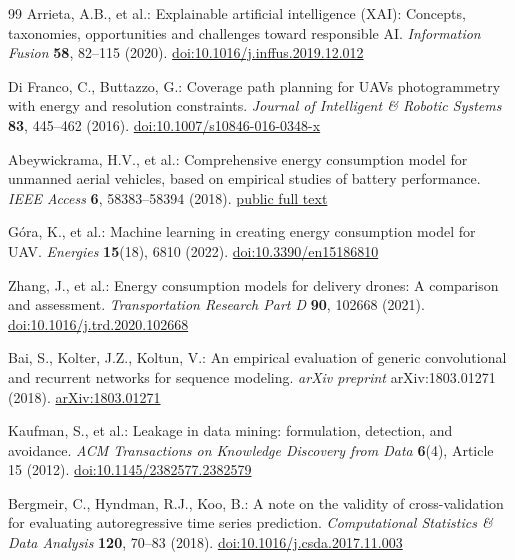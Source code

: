 \documentclass[runningheads,a4paper]{llncs}
\begin{document}
\begin{thebibliography}{99}
Arrieta, A.B., et al.: Explainable artificial intelligence (XAI): Concepts, taxonomies, opportunities and challenges toward responsible AI. \textit{Information Fusion} \textbf{58}, 82--115 (2020). \href{https://doi.org/10.1016/j.inffus.2019.12.012}{doi:10.1016/j.inffus.2019.12.012}

Di Franco, C., Buttazzo, G.: Coverage path planning for UAVs photogrammetry with energy and resolution constraints. \textit{Journal of Intelligent \& Robotic Systems} \textbf{83}, 445--462 (2016). \href{https://doi.org/10.1007/s10846-016-0348-x}{doi:10.1007/s10846-016-0348-x}

Abeywickrama, H.V., et al.: Comprehensive energy consumption model for unmanned aerial vehicles, based on empirical studies of battery performance. \textit{IEEE Access} \textbf{6}, 58383--58394 (2018). \href{https://www.researchgate.net/publication/328188643_Comprehensive_Energy_Consumption_Model_for_Unmanned_Aerial_Vehicles_Based_on_Empirical_Studies_of_Battery_Performance}{public full text}

G\'ora, K., et al.: Machine learning in creating energy consumption model for UAV. \textit{Energies} \textbf{15}(18), 6810 (2022). \href{https://doi.org/10.3390/en15186810}{doi:10.3390/en15186810}

Zhang, J., et al.: Energy consumption models for delivery drones: A comparison and assessment. \textit{Transportation Research Part D} \textbf{90}, 102668 (2021). \href{https://doi.org/10.1016/j.trd.2020.102668}{doi:10.1016/j.trd.2020.102668}

Bai, S., Kolter, J.Z., Koltun, V.: An empirical evaluation of generic convolutional and recurrent networks for sequence modeling. \textit{arXiv preprint} arXiv:1803.01271 (2018). \href{https://arxiv.org/abs/1803.01271}{arXiv:1803.01271}

Kaufman, S., et al.: Leakage in data mining: formulation, detection, and avoidance. \textit{ACM Transactions on Knowledge Discovery from Data} \textbf{6}(4), Article 15 (2012). \href{https://doi.org/10.1145/2382577.2382579}{doi:10.1145/2382577.2382579}

Bergmeir, C., Hyndman, R.J., Koo, B.: A note on the validity of cross-validation for evaluating autoregressive time series prediction. \textit{Computational Statistics \& Data Analysis} \textbf{120}, 70--83 (2018). \href{https://doi.org/10.1016/j.csda.2017.11.003}{doi:10.1016/j.csda.2017.11.003}


\end{thebibliography}
\end{document}

